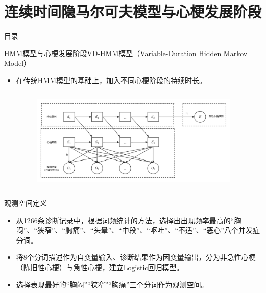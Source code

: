 \documentclass{beamer}
\begin{document}
\section{连续时间隐马尔可夫模型与心梗发展阶段}
\begin{frame}{目录}
\tableofcontents[sectionstyle=show/shaded,subsectionstyle=show/shaded/hide]
\end{frame}

\begin{frame}{HMM模型与心梗发展阶段}{VD-HMM模型（Variable-Duration Hidden Markov Model）}
\begin{itemize}
    \item 
    在传统HMM模型的基础上，加入不同心梗阶段的持续时长。
    
       \begin{figure}
  	\includegraphics[width=10cm, height=5cm]{VDHMM模型}
    \end{figure}
\end{itemize}
\end{frame}

\begin{frame}{观测空间定义}
\begin{itemize}
    \item 
    从1266条诊断记录中，根据词频统计的方法，选择出出现频率最高的“胸闷”、“狭窄”、“胸痛”、“头晕”、“中段”、“呕吐”、“不适”、“恶心”八个并发症分词。
    \item
    将8个分词描述作为自变量输入、诊断结果作为因变量输出，分为非急性心梗（陈旧性心梗）与急性心梗，建立Logistic回归模型。
    \item 
    选择表现最好的“胸闷”“狭窄”“胸痛”三个分词作为观测空间。
\end{itemize}
\end{frame}
\end{document}
